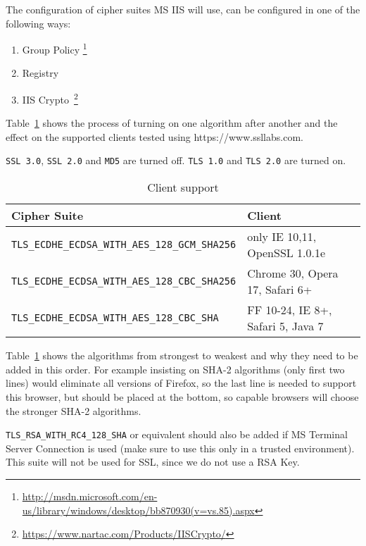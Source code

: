 The configuration of cipher suites MS IIS will use, can be configured in one
of the following ways:
\begin{enumerate}
  \item Group Policy \footnote{\url{http://msdn.microsoft.com/en-us/library/windows/desktop/bb870930(v=vs.85).aspx}}
  \item Registry
  \item IIS Crypto~\footnote{\url{https://www.nartac.com/Products/IISCrypto/}}
\end{enumerate}

Table~\ref{tab:MS_IIS_Client_Support} shows the process of turning on
one algorithm after another and the effect on the supported clients
tested using https://www.ssllabs.com.

\verb|SSL 3.0|, \verb|SSL 2.0| and \verb|MD5| are turned off.
\verb|TLS 1.0| and \verb|TLS 2.0| are turned on.

\begin{table}[h]
  \centering
  \small
  \begin{tabular}{ll}
    \toprule
    Cipher Suite & Client \\
    \midrule
    \verb|TLS_ECDHE_ECDSA_WITH_AES_128_GCM_SHA256| & only IE 10,11, OpenSSL 1.0.1e \\
    \verb|TLS_ECDHE_ECDSA_WITH_AES_128_CBC_SHA256| & Chrome 30, Opera 17, Safari 6+ \\
    \verb|TLS_ECDHE_ECDSA_WITH_AES_128_CBC_SHA| & FF 10-24, IE 8+, Safari 5, Java 7\\
    \bottomrule 
  \end{tabular}
  \caption{Client support}
  \label{tab:MS_IIS_Client_Support}
\end{table}

Table~\ref{tab:MS_IIS_Client_Support} shows the algorithms from
strongest to weakest and why they need to be added in this order. For
example insisting on SHA-2 algorithms (only first two lines) would
eliminate all versions of Firefox, so the last line is needed to
support this browser, but should be placed at the bottom, so capable
browsers will choose the stronger SHA-2 algorithms.

\verb|TLS_RSA_WITH_RC4_128_SHA| or equivalent should also be added if
MS Terminal Server Connection is used (make sure to use this only in a
trusted environment). This suite will not be used for SSL, since we do
not use a RSA Key.


